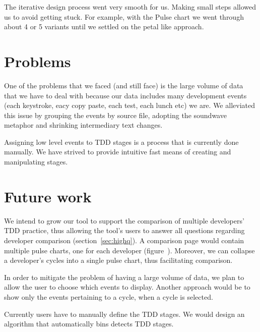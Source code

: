 \documentclass[journal]{vgtc}                %
\begin{document}
The iterative design process went very smooth for us.
Making small steps allowed us to avoid getting stuck.
For example, with the Pulse chart we went through about 4 or 5 variants until we settled on the petal like approach.


\section{Problems}

One of the problems that we faced (and still face) is the large volume of data that we have to deal with because our data includes many development events (each keystroke, eacy copy paste, each test, each lunch etc) we are.
We alleviated this issue by grouping the events by source file, adopting the soundwave metaphor and shrinking intermediary text changes.

Assigning low level events to TDD stages is a process that is currently done manually.
We have strived to provide intuitive fast means of creating and manipulating stages.

\section{Future work}

We intend to grow our tool to support the comparison of multiple developers' TDD practice, thus allowing the tool's users to answer all questions regarding developer comparison (section~\ref{sec:highq}).
A comparison page would contain multiple pulse charts, one for each developer (figure~).
Moreover, we can collapse a developer's cycles into a single pulse chart, thus facilitating comparison.


In order to mitigate the problem of having a large volume of data, we plan to allow the user to choose which events to display.
Another approach would be to show only the events pertaining to a cycle, when a cycle is selected.

Currently users have to manually define the TDD stages.
We would design an algorithm that automatically bins detects TDD stages.
 



\end{document}
